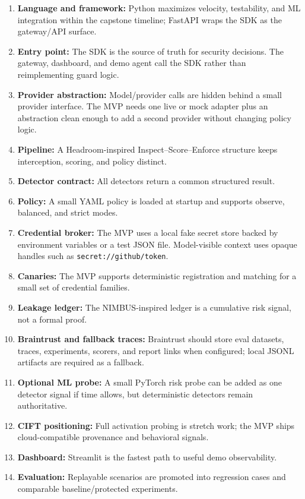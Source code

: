 \documentclass[11pt,letterpaper]{article}
\begin{document}
\begin{enumerate}
    \item \textbf{Language and framework:} Python maximizes velocity, testability, and ML integration within the capstone timeline; FastAPI wraps the SDK as the gateway/API surface.
    \item \textbf{Entry point:} The SDK is the source of truth for security decisions. The gateway, dashboard, and demo agent call the SDK rather than reimplementing guard logic.
    \item \textbf{Provider abstraction:} Model/provider calls are hidden behind a small provider interface. The MVP needs one live or mock adapter plus an abstraction clean enough to add a second provider without changing policy logic.
    \item \textbf{Pipeline:} A Headroom-inspired Inspect--Score--Enforce structure keeps interception, scoring, and policy distinct.
    \item \textbf{Detector contract:} All detectors return a common structured result.
    \item \textbf{Policy:} A small YAML policy is loaded at startup and supports observe, balanced, and strict modes.
    \item \textbf{Credential broker:} The MVP uses a local fake secret store backed by environment variables or a test JSON file. Model-visible context uses opaque handles such as \texttt{secret://github/token}.
    \item \textbf{Canaries:} The MVP supports deterministic registration and matching for a small set of credential families.
    \item \textbf{Leakage ledger:} The NIMBUS-inspired ledger is a cumulative risk signal, not a formal proof.
    \item \textbf{Braintrust and fallback traces:} Braintrust should store eval datasets, traces, experiments, scorers, and report links when configured; local JSONL artifacts are required as a fallback.
    \item \textbf{Optional ML probe:} A small PyTorch risk probe can be added as one detector signal if time allows, but deterministic detectors remain authoritative.
    \item \textbf{CIFT positioning:} Full activation probing is stretch work; the MVP ships cloud-compatible provenance and behavioral signals.
    \item \textbf{Dashboard:} Streamlit is the fastest path to useful demo observability.
    \item \textbf{Evaluation:} Replayable scenarios are promoted into regression cases and comparable baseline/protected experiments.
\end{enumerate}
\end{document}
